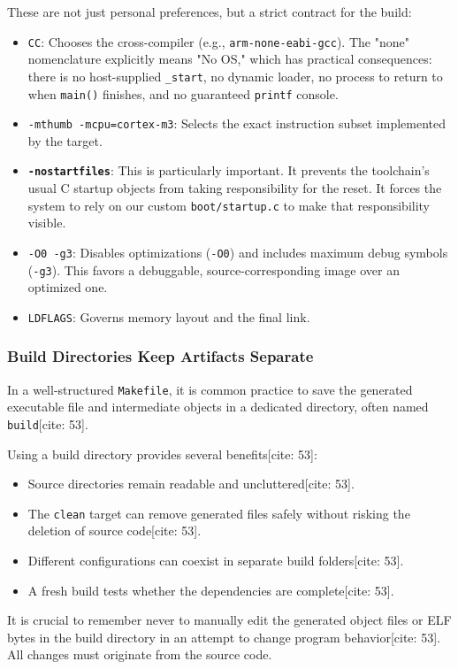 These are not just personal preferences, but a strict contract for the build:
\begin{itemize}
    \item \texttt{CC}: Chooses the cross-compiler (e.g., \texttt{arm-none-eabi-gcc}). The "none" nomenclature explicitly means "No OS," which has practical consequences: there is no host-supplied \texttt{\_start}, no dynamic loader, no process to return to when \texttt{main()} finishes, and no guaranteed \texttt{printf} console.
    \item \texttt{-mthumb -mcpu=cortex-m3}: Selects the exact instruction subset implemented by the target.
    \item \textbf{\texttt{-nostartfiles}}: This is particularly important. It prevents the toolchain's usual C startup objects from taking responsibility for the reset. It forces the system to rely on our custom \texttt{boot/startup.c} to make that responsibility visible.
    \item \texttt{-O0 -g3}: Disables optimizations (\texttt{-O0}) and includes maximum debug symbols (\texttt{-g3}). This favors a debuggable, source-corresponding image over an optimized one.
    \item \texttt{LDFLAGS}: Governs memory layout and the final link.
\end{itemize}

\subsubsection{Build Directories Keep Artifacts Separate}
In a well-structured \texttt{Makefile}, it is common practice to save the generated executable file and intermediate objects in a dedicated directory, often named \texttt{build}[cite: 53]. 

Using a build directory provides several benefits[cite: 53]:
\begin{itemize}
    \item Source directories remain readable and uncluttered[cite: 53].
    \item The \texttt{clean} target can remove generated files safely without risking the deletion of source code[cite: 53].
    \item Different configurations can coexist in separate build folders[cite: 53].
    \item A fresh build tests whether the dependencies are complete[cite: 53].
\end{itemize}
It is crucial to remember never to manually edit the generated object files or ELF bytes in the build directory in an attempt to change program behavior[cite: 53]. All changes must originate from the source code.

